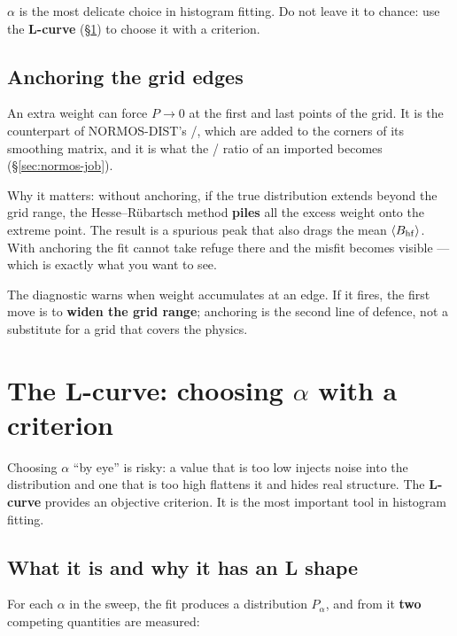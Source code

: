 \begin{aviso}
$\alpha$ is the most delicate choice in histogram fitting. Do not leave it to chance:
use the \textbf{L-curve} (\S\ref{sec:lcurve}) to choose it with a criterion.
\end{aviso}

\subsection{Anchoring the grid edges}
\label{sec:edge-anchor}

An extra weight can force $P \to 0$ at the first and last points of the grid.
It is the counterpart of NORMOS-DIST's /, which are added
to the corners of its smoothing matrix, and it is what the /
ratio of an imported  becomes (\S\ref{sec:normos-job}).

Why it matters: without anchoring, if the true distribution extends beyond the
grid range, the Hesse--Rübartsch method \textbf{piles} all the excess weight onto
the extreme point. The result is a spurious peak that also drags the mean
$\langle B_{\mathrm{hf}} \rangle$. With anchoring the fit cannot take refuge there and the
misfit becomes visible --- which is exactly what you want to see.

\begin{truco}
The  diagnostic warns when weight accumulates at an edge. If
it fires, the first move is to \textbf{widen the grid range}; anchoring is the
second line of defence, not a substitute for a grid that covers the physics.
\end{truco}

\section{The L-curve: choosing $\alpha$ with a criterion}
\label{sec:lcurve}

Choosing $\alpha$ ``by eye'' is risky: a value that is too low injects noise into the
distribution and one that is too high flattens it and hides real structure. The
\textbf{L-curve} provides an objective criterion. It is the most important tool in
histogram fitting.

\subsection{What it is and why it has an L shape}

For each $\alpha$ in the sweep, the fit produces a distribution $P_\alpha$, and from
it \textbf{two} competing quantities are measured:

